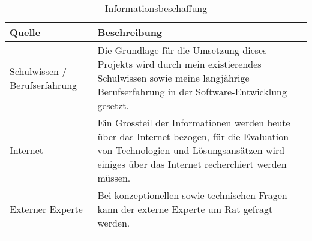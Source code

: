 \begin{longtable}[]{@{}p{3cm}p{10cm}@{}}
  \toprule
  \textbf{Quelle}               & \textbf{Beschreibung}\tabularnewline
  \toprule
  Schulwissen / Berufserfahrung & Die Grundlage für die Umsetzung dieses Projekts wird durch mein existierendes Schulwissen sowie meine langjährige Berufserfahrung in der Software-Entwicklung gesetzt.\tabularnewline
  \midrule
  Internet                      & Ein Grossteil der Informationen werden heute über das Internet bezogen, für die Evaluation von Technologien und Lösungsansätzen wird einiges über das Internet recherchiert werden müssen.\tabularnewline
  \midrule
  Externer Experte              & Bei konzeptionellen sowie technischen Fragen kann der externe Experte um Rat gefragt werden.\tabularnewline
  \bottomrule
  \caption{Informationsbeschaffung}
\end{longtable}
